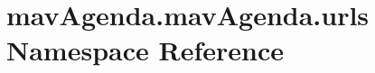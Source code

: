 \hypertarget{namespacemavAgenda_1_1mavAgenda_1_1urls}{}\section{mav\+Agenda.\+mav\+Agenda.\+urls Namespace Reference}
\label{namespacemavAgenda_1_1mavAgenda_1_1urls}

